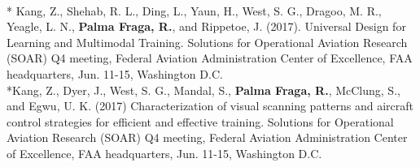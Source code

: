 \documentclass[a4paper,10pt]{article}
\begin{document}
{    \vspace{0.3cm}
    \\* Kang, Z., Shehab, R. L., Ding, L., Yaun, H., West, S. G., Dragoo, M. R., Yeagle, L. N., \textbf{Palma Fraga, R.}, and Rippetoe, J. (2017). Universal Design for Learning and Multimodal Training. Solutions for Operational Aviation Research (SOAR) Q4 meeting, Federal Aviation Administration Center of Excellence, FAA headquarters, Jun. 11-15, Washington D.C. 
    \vspace{0.3cm}
    \\*Kang, Z., Dyer, J., West, S. G., Mandal, S., \textbf{Palma Fraga, R.}, McClung, S., and Egwu, U. K. (2017) Characterization of visual scanning patterns and aircraft control strategies for efficient and effective training. Solutions for Operational Aviation Research (SOAR) Q4 meeting, Federal Aviation Administration Center of Excellence, FAA headquarters, Jun. 11-15, Washington D.C. 
}
\end{document}
